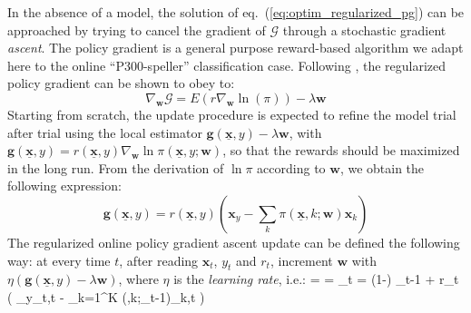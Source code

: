 \documentclass[conference]{IEEEtran}
\makeatletter
\newenvironment{equationsize}[1]{%
  \skip@=\baselineskip
  #1%
  \baselineskip=\skip@
  \equation
}{\endequation \ignorespacesafterend}
\makeatother
\begin{document}
In the absence of a model, the solution of eq.~(\ref{eq:optim_regularized_pg}) can be approached 
by trying to cancel the gradient of $\mathcal{G}$
through a stochastic gradient \emph{ascent}.
The policy gradient is a general purpose reward-based algorithm we adapt here to the online 
``P300-speller'' classification case. 
Following \cite{Wil92}, the regularized policy gradient can be shown to obey to: 
\begin{equation}\label{eq:regularized_pg}
\nabla_{\boldsymbol{w}} \mathcal{G} = E(r \nabla_{\boldsymbol{w}} \ln(\pi)) - \lambda  \boldsymbol{w} 
\end{equation} 
Starting from scratch, the update procedure is expected to refine the model trial after trial 
using the local estimator $\boldsymbol{g}(\underline{\mathbf{x}}, y) - \lambda \boldsymbol{w}$,
with
$\boldsymbol{g}(\underline{\mathbf{x}}, y) =  r(\underline{\mathbf{x}},y)\nabla_{\boldsymbol{w}}\ln \pi(\underline{\mathbf{x}},y;\boldsymbol{w})$, 
so that the rewards should be maximized in the long run. 
From the derivation of $\ln \pi$ according to $\boldsymbol{w}$, we obtain the following expression:
\begin{equation}\label{eq:pol_grad_multi}
 \boldsymbol{g}(\underline{\mathbf{x}}, y) 
= r(\underline{\mathbf{x}},y) \left(\boldsymbol{x}_y - \sum_k  \pi(\underline{\mathbf{x}},k;\boldsymbol{w})\boldsymbol{x}_k\right)
\end{equation}
The regularized online policy gradient ascent update  
can be defined the following way:
at every time $t$, after reading $\boldsymbol{x}_t$, $y_t$ and $r_t$, increment $\boldsymbol{w}$ 
with $\eta\left(\boldsymbol{g}(\underline{\mathbf{x}}, y) - \lambda \boldsymbol{w}\right)$, where $\eta$ is the \emph{learning rate}, i.e.:
\begin{equationsize}{\small}\label{eq:online_update}
_t = (1-\eta\lambda) _{t-1} + \eta r_t \left( _{y_t,t} 
- \sum_{k=1}^K  \pi(\underline{},k;_{t-1})_{k,t} \right) 
\end{equationsize}
\end{document}
